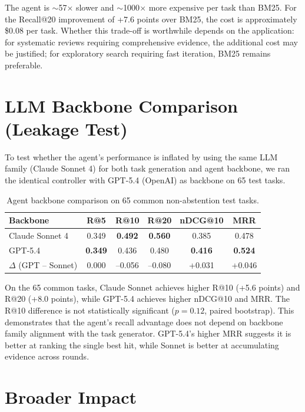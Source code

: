 \documentclass{article}
\begin{document}
The agent is ${\sim}$57$\times$ slower and ${\sim}$1000$\times$ more expensive per task than BM25. For the Recall@20 improvement of +7.6 points over BM25, the cost is approximately \$0.08 per task. Whether this trade-off is worthwhile depends on the application: for systematic reviews requiring comprehensive evidence, the additional cost may be justified; for exploratory search requiring fast iteration, BM25 remains preferable.

\section{LLM Backbone Comparison (Leakage Test)}
\label{app:leakage}

To test whether the agent's performance is inflated by using the same LLM family (Claude Sonnet 4) for both task generation and agent backbone, we ran the identical controller with GPT-5.4 (OpenAI) as backbone on 65 test tasks.

\begin{table}[h]
\centering
\caption{Agent backbone comparison on 65 common non-abstention test tasks.}
\small
\begin{tabular}{lccccc}
\toprule
\textbf{Backbone} & \textbf{R@5} & \textbf{R@10} & \textbf{R@20} & \textbf{nDCG@10} & \textbf{MRR} \\
\midrule
Claude Sonnet 4 & 0.349 & \textbf{0.492} & \textbf{0.560} & 0.385 & 0.478 \\
GPT-5.4 & \textbf{0.349} & 0.436 & 0.480 & \textbf{0.416} & \textbf{0.524} \\
\midrule
$\Delta$ (GPT -- Sonnet) & 0.000 & --0.056 & --0.080 & +0.031 & +0.046 \\
\bottomrule
\end{tabular}
\end{table}

On the 65 common tasks, Claude Sonnet achieves higher R@10 (+5.6 points) and R@20 (+8.0 points), while GPT-5.4 achieves higher nDCG@10 and MRR. The R@10 difference is not statistically significant ($p{=}0.12$, paired bootstrap). This demonstrates that the agent's recall advantage does not depend on backbone family alignment with the task generator. GPT-5.4's higher MRR suggests it is better at ranking the single best hit, while Sonnet is better at accumulating evidence across rounds.

\section{Broader Impact}
\label{app:impact}
\end{document}
